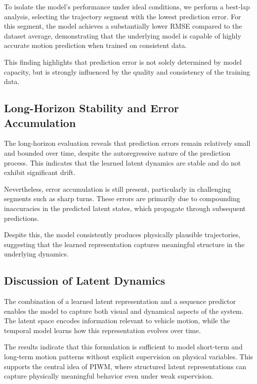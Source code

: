 \documentclass[preprint,12pt]{elsarticle}
\begin{document}
To isolate the model's performance under ideal conditions, we perform a best-lap analysis, selecting the trajectory segment with the lowest prediction error. For this segment, the model achieves a substantially lower RMSE compared to the dataset average, demonstrating that the underlying model is capable of highly accurate motion prediction when trained on consistent data.

This finding highlights that prediction error is not solely determined by model capacity, but is strongly influenced by the quality and consistency of the training data.

\subsection{Long-Horizon Stability and Error Accumulation}

The long-horizon evaluation reveals that prediction errors remain relatively small and bounded over time, despite the autoregressive nature of the prediction process. This indicates that the learned latent dynamics are stable and do not exhibit significant drift.

Nevertheless, error accumulation is still present, particularly in challenging segments such as sharp turns. These errors are primarily due to compounding inaccuracies in the predicted latent states, which propagate through subsequent predictions.

Despite this, the model consistently produces physically plausible trajectories, suggesting that the learned representation captures meaningful structure in the underlying dynamics.

\subsection{Discussion of Latent Dynamics}

The combination of a learned latent representation and a sequence predictor enables the model to capture both visual and dynamical aspects of the system. The latent space encodes information relevant to vehicle motion, while the temporal model learns how this representation evolves over time.

The results indicate that this formulation is sufficient to model short-term and long-term motion patterns without explicit supervision on physical variables. This supports the central idea of PIWM, where structured latent representations can capture physically meaningful behavior even under weak supervision.
\end{document}
